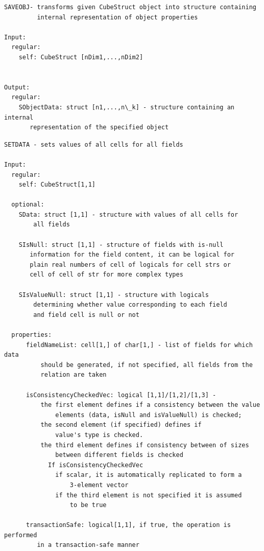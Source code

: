 \documentclass[letterpaper,10pt,english]{sphinxmanual}
\begin{document}
\label{chap_func:smartdb-relations-atypifiedstaticrelation-saveobj}
\begin{Verbatim}[commandchars=\\\{\}]
SAVEOBJ- transforms given CubeStruct object into structure containing
         internal representation of object properties

Input:
  regular:
    self: CubeStruct [nDim1,...,nDim2]


Output:
  regular:
    SObjectData: struct [n1,...,n\_k] - structure containing an internal
       representation of the specified object
\end{Verbatim}
\label{chap_func:smartdb-relations-atypifiedstaticrelation-setdata}
\begin{Verbatim}[commandchars=\\\{\}]
SETDATA - sets values of all cells for all fields

Input:
  regular:
    self: CubeStruct[1,1]

  optional:
    SData: struct [1,1] - structure with values of all cells for
        all fields

    SIsNull: struct [1,1] - structure of fields with is-null
       information for the field content, it can be logical for
       plain real numbers of cell of logicals for cell strs or
       cell of cell of str for more complex types

    SIsValueNull: struct [1,1] - structure with logicals
        determining whether value corresponding to each field
        and field cell is null or not

  properties:
      fieldNameList: cell[1,] of char[1,] - list of fields for which data
          should be generated, if not specified, all fields from the
          relation are taken

      isConsistencyCheckedVec: logical [1,1]/[1,2]/[1,3] -
          the first element defines if a consistency between the value
              elements (data, isNull and isValueNull) is checked;
          the second element (if specified) defines if
              value's type is checked.
          the third element defines if consistency between of sizes
              between different fields is checked
            If isConsistencyCheckedVec
              if scalar, it is automatically replicated to form a
                  3-element vector
              if the third element is not specified it is assumed
                  to be true

      transactionSafe: logical[1,1], if true, the operation is performed
         in a transaction-safe manner


\end{Verbatim}
\end{document}
